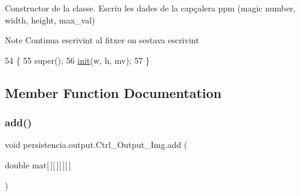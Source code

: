 Constructor de la classe. Escriu les dades de la capçalera ppm (magic number, width, height, max\+\_\+val) 

\begin{DoxyNote}{Note}
Continua escrivint al fitxer on s\textquotesingle{}estava escrivint 
\end{DoxyNote}

\begin{DoxyCode}
54                                                  \{
55         super();
56         \hyperlink{classpersistencia_1_1output_1_1Ctrl__Output__Img_aab3258280bd6abb81d580c93eb68fb28}{init}(w, h, mv);        
57     \}
\end{DoxyCode}


\subsection{Member Function Documentation}
\mbox{\label{classpersistencia_1_1output_1_1Ctrl__Output__Img_a305a977f4d4b999cf65e14e7106b6c5e}} 
\subsubsection{\texorpdfstring{add()}{add()}}
{\footnotesize\ttfamily void persistencia.\+output.\+Ctrl\+\_\+\+Output\+\_\+\+Img.\+add (\begin{DoxyParamCaption}\item[{double}]{mat\mbox{[}$\,$\mbox{]}\mbox{[}$\,$\mbox{]}\mbox{[}$\,$\mbox{]}\mbox{[}$\,$\mbox{]} }\end{DoxyParamCaption})\hspace{0.3cm}{\ttfamily [inline]}}


